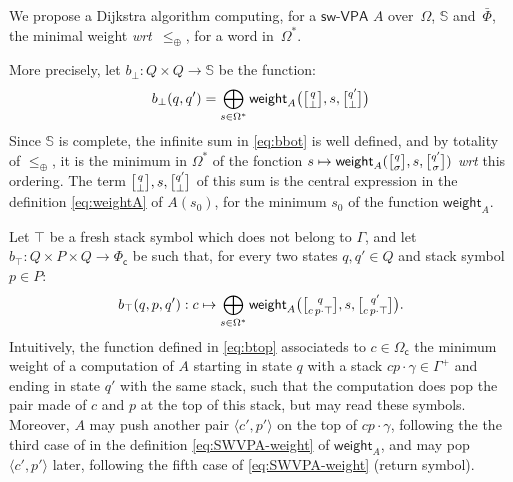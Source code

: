 \documentclass[runningheads]{llncs}
\def\wrt{\textit{wrt}\xspace}
\def\<#1>{\langle #1 \rangle}
\newcommand{\Semiring}{\mathbb{S}}
\def\SWVPA{\textsf{sw-VPA}\xspace}
\def\weight{\mathsf{weight}}
\def\Omegac{{\Omega_\mathsf{c}}}
\def\Phic{{\Phi_\mathsf{c}}}
\newcommand{\config}[2]{\ensuremath \genfrac{[}{]}{0pt}{}{#1}{#2}}
\begin{document}
We propose a Dijkstra algorithm computing, for a $\SWVPA$ $A$
over~$\Omega$, $\Semiring$ and~$\bar\Phi$, 
the minimal weight \wrt~$\leq_\oplus$, for a word in~$\Omega^*$.

\noindent
More precisely, 
let $b_\bot : Q \times Q \to \Semiring$ be the function:
%
\begin{equation}\label{eq:bbot}
  b_\bot(q, q') = \bigoplus_{s\in \Omega^*} 
  \textstyle
  \weight_A\bigl(\config{q}{\bot}, s, \config{q'}{\bot}\bigr)
\end{equation}
%
Since $\Semiring$ is complete, the infinite sum in \eqref{eq:bbot} is well defined,
and by totality of $\leq_\oplus$, it is the minimum in $\Omega^*$
of the fonction 
$s \mapsto \weight_A(\config{q}{\sigma}, s, \config{q'}{\sigma})$ 
\wrt this ordering.
%
The term $\config{q}{\bot}, s, \config{q'}{\bot}$ 
of this sum is the central expression in 
the definition \eqref{eq:weightA} of $A(s_0)$, for the minimum $s_0$
of the function $\weight_A$.

%
\noindent
Let $\top$ be a fresh stack symbol which does not belong to $\Gamma$,
and let $b_\top : Q \times P \times Q \to \Phic$ be such that,
for every two states $q, q' \in Q$ 
and stack symbol $p \in P$: %
\begin{equation}\label{eq:btop}
  b_\top(q, p, q') : c \mapsto \bigoplus_{s\in \Omega^*} 
  \textstyle
  \weight_A\bigl(\config{q}{c\,p\cdot \top }, s, \config{q'}{c\, p\cdot \top}\bigr). 
\end{equation}
%
Intuitively, the function defined in \eqref{eq:btop}
associateds to $c \in \Omegac$ 
the minimum weight of a computation of $A$
starting in state $q$ with a stack 
$c p \cdot \gamma \in \Gamma^+$ 
and ending in state $q'$ with the same stack,
such that the computation does pop 
the pair made of $c$ and $p$ at the top of this stack,
but may read these symbols.
Moreover, $A$ may push another pair $\< c', p'>$ %
on the top of $c p \cdot \gamma$,
following the the third case of 
in the definition \eqref{eq:SWVPA-weight} of $\weight_A$,
and may pop $\< c', p'>$ later, following the fifth case of \eqref{eq:SWVPA-weight} (return symbol). 
\end{document}
